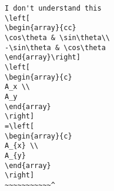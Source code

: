 \begin{verbatim}
I don't understand this
\left[
\begin{array}{cc}
\cos\theta & \sin\theta\\
-\sin\theta & \cos\theta
\end{array}\right]
\left[
\begin{array}{c}
A_x \\ 
A_y 
\end{array}
\right]
=\left[
\begin{array}{c}
A_{x} \\ 
A_{y} 
\end{array}
\right]
~~~~~~~~~~~^
\end{verbatim}
